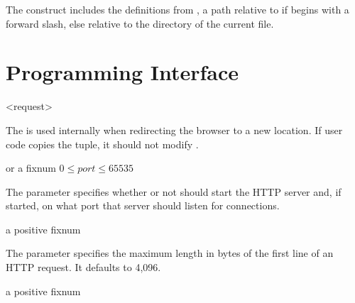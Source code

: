 \begin{syntax}
\end{syntax}\antipar

The  construct includes the definitions from
, a path relative to  if
 begins with a forward slash, else relative to the
directory of the current file.


\section {Programming Interface}

\begin{tupledef}{<request>}
\end{tupledef}

The  is used internally when redirecting the
browser to a new location. If user code copies the 
tuple, it should not modify .

\begin{parameter}
\end{parameter}
\hasvalue{}  or a fixnum $0 \le port \le 65535$

The  parameter specifies whether or not
 should start the HTTP server and,
if started, on what port that server should listen for connections.

\begin{parameter}
\end{parameter}
\hasvalue{} a positive fixnum

The  parameter specifies the maximum length
in bytes of the first line of an HTTP request. It defaults to 4,096.

\begin{parameter}
\end{parameter}
\hasvalue{} a positive fixnum

